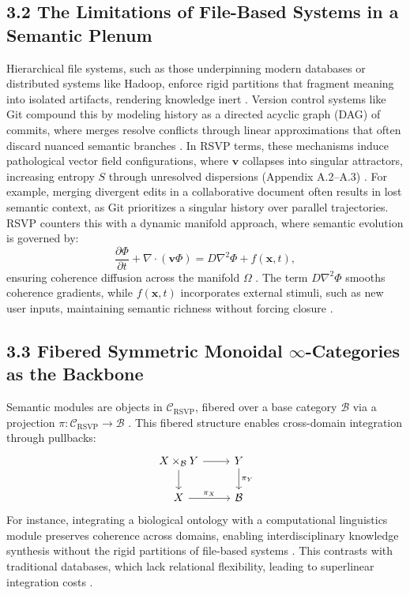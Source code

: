 \documentclass[12pt]{article}
\begin{document}
\subsection*{3.2 The Limitations of File-Based Systems in a Semantic Plenum}
Hierarchical file systems, such as those underpinning modern databases or distributed systems like Hadoop, enforce rigid partitions that fragment meaning into isolated artifacts, rendering knowledge inert \citep{bird1988}. Version control systems like Git compound this by modeling history as a directed acyclic graph (DAG) of commits, where merges resolve conflicts through linear approximations that often discard nuanced semantic branches \citep{bird1988}. In RSVP terms, these mechanisms induce pathological vector field configurations, where \(\mathbf{v}\) collapses into singular attractors, increasing entropy \(S\) through unresolved dispersions (Appendix A.2--A.3) \citep{cover2006}. For example, merging divergent edits in a collaborative document often results in lost semantic context, as Git prioritizes a singular history over parallel trajectories.
RSVP counters this with a dynamic manifold approach, where semantic evolution is governed by:
\[
\frac{\partial \Phi}{\partial t} + \nabla \cdot (\mathbf{v} \Phi) = D \nabla^2 \Phi + f(\mathbf{x}, t),
\]
ensuring coherence diffusion across the manifold \(\Omega\) \citep{gromov1999}. The term \(D \nabla^2 \Phi\) smooths coherence gradients, while \(f(\mathbf{x}, t)\) incorporates external stimuli, such as new user inputs, maintaining semantic richness without forcing closure \citep{jaynes2003}.

\subsection*{3.3 Fibered Symmetric Monoidal \(\infty\)-Categories as the Backbone}
Semantic modules are objects in \(\mathcal{C}_{\text{RSVP}}\), fibered over a base category \(\mathcal{B}\) via a projection \(\pi: \mathcal{C}_{\text{RSVP}} \to \mathcal{B}\) \citep{lawvere2009}. This fibered structure enables cross-domain integration through pullbacks:
\[
\begin{tikzcd}
X \times_{\mathcal{B}} Y \arrow[r] \arrow[d] & Y \arrow[d, "\pi_Y"] \\
X \arrow[r, "\pi_X"] & \mathcal{B}
\end{tikzcd}
\]
For instance, integrating a biological ontology with a computational linguistics module preserves coherence across domains, enabling interdisciplinary knowledge synthesis without the rigid partitions of file-based systems \citep{maclane1998}. This contrasts with traditional databases, which lack relational flexibility, leading to superlinear integration costs \citep{bird1988}.
\end{document}
